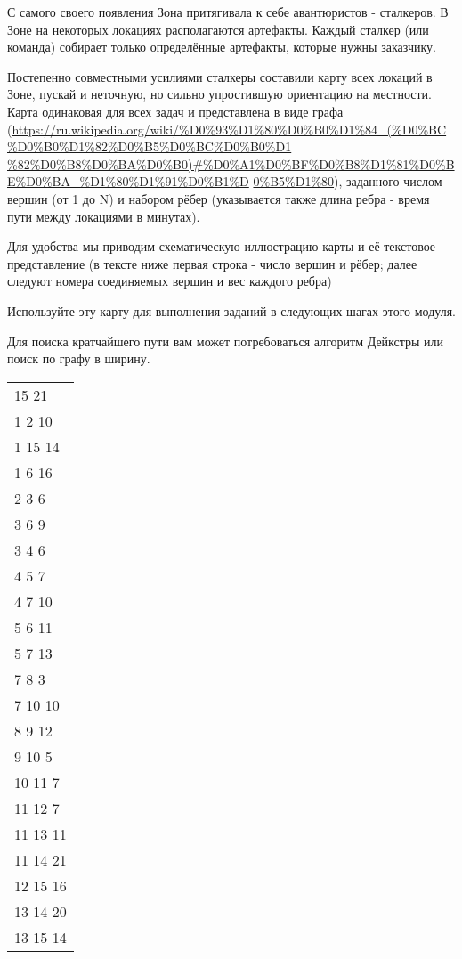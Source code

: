 
С самого своего появления Зона притягивала к себе авантюристов - сталкеров. В Зоне на некоторых локациях располагаются артефакты. Каждый сталкер (или команда) собирает только определённые артефакты, которые нужны заказчику.

Постепенно совместными усилиями сталкеры составили карту всех локаций в Зоне, пускай и неточную, 
    но сильно упростившую ориентацию на местности. Карта одинаковая для всех задач и представлена в виде графа
    (\url{https://ru.wikipedia.org/wiki/%D0%93%D1%80%D0%B0%D1%84_(%D0%BC%D0%B0%D1%82%D0%B5%D0%BC%D0%B0%D1} \linebreak \url{%82%D0%B8%D0%BA%D0%B0)#%D0%A1%D0%BF%D0%B8%D1%81%D0%BE%D0%BA_%D1%80%D1%91%D0%B1%D} \linebreak \url{0%B5%D1%80}), заданного числом вершин (от 1 до N) и набором рёбер (указывается также длина ребра - время пути между локациями в минутах).

Для удобства мы приводим схематическую иллюстрацию карты и её текстовое представление (в тексте ниже первая строка - число вершин и рёбер; далее следуют номера соединяемых вершин и вес каждого ребра)

Используйте эту карту для выполнения заданий в следующих шагах этого модуля.

Для поиска кратчайшего пути вам может потребоваться алгоритм Дейкстры или поиск по графу в ширину.


\begin{longtable}{l}
    15 21 \\
    1 2 10 \\
    1 15 14 \\
    1 6 16 \\ 
    2 3 6 \\
    3 6 9 \\
    3 4 6 \\
    4 5 7 \\
    4 7 10 \\
    5 6 11 \\
    5 7 13 \\
    7 8 3 \\
    7 10 10 \\
    8 9 12 \\
    9 10 5 \\
    10 11 7 \\
    11 12 7 \\
    11 13 11 \\
    11 14 21 \\
    12 15 16 \\
    13 14 20 \\
    13 15 14 \\
\end{longtable}

